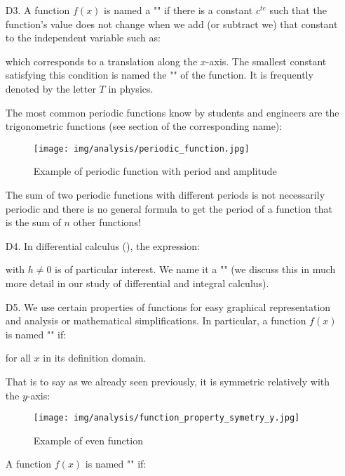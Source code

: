 \begin{enumerate}
		\item[D3.] A function $f(x)$ is named a "" if there is a constant $c^{te}$ such that the function's value does not change when we add (or subtract we) that constant to the independent variable such as:
		
		which corresponds to a translation along the $x$-axis. The smallest constant satisfying this condition is named the "" of the function. It is frequently denoted by the letter $T$ in physics.
		
		The most common periodic functions know by students and engineers are the trigonometric functions (see section of the corresponding name):
		\begin{figure}[H]
			\centering
			\texttt{[image: img/analysis/periodic\_function.jpg]}
			\caption{Example of periodic function with period and amplitude}
		\end{figure}
		 \begin{tcolorbox}[title=Remark,colframe=black,arc=10pt]
		The sum of two periodic functions with different periods is not necessarily periodic and there is no general formula to get the period of a function that is the sum of $n$ other functions!
		\end{tcolorbox}
		
		\item[D4.] In differential calculus (), the expression:
		
		with $h\neq 0$ is of particular interest. We name it a "" (we discuss this in much more detail in our study of differential and integral calculus).
		
		\item[D5.] We use certain properties of functions for easy graphical representation and analysis or mathematical simplifications. In particular, a function $f (x)$ is named "" if:
		
		for all $x$ in its definition domain.
		
		That is to say as we already seen previously, it is symmetric relatively with the $y$-axis:
		\begin{figure}[H]
			\centering
			\texttt{[image: img/analysis/function\_property\_symetry\_y.jpg]}
			\caption{Example of even function}
		\end{figure}
		A function $f (x)$ is named "" if:
		

\end{enumerate}
